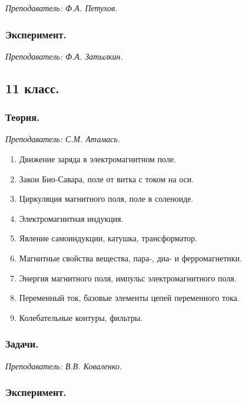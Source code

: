 \documentclass[12pt]{article}
\newlength{\h}
\newlength{\x}
\begin{document}
\textit{Преподаватель: Ф.А. Петухов.}

\subsubsection{Эксперимент.}
\label{sec:daily10exp}

\textit{Преподаватель: Ф.А. Затылкин.}\\

\subsection{11 класс.}
\label{sec:daily11}

\subsubsection{Теория.}
\label{sec:daily11th}

\textit{Преподаватель: С.М. Атамась.}\\

\begin{enumerate}
\item Движение заряда в электромагнитном поле.
\item Закон Био-Савара, поле от витка с током на оси.
\item Циркуляция магнитного поля, поле в соленоиде.
\item Электромагнитная индукция.
\item Явление самоиндукции, катушка, трансформатор.
\item Магнитные свойства вещества, пара-, диа- и ферромагнетики.
\item Энергия магнитного поля, импульс электромагнитного поля.
\item Переменный ток, базовые элементы цепей переменного тока.
\item Колебательные контуры, фильтры. 
\end{enumerate}

\subsubsection{Задачи.}
\label{sec:daily11pr}

\textit{Преподаватель: В.В. Коваленко.}\\

\subsubsection{Эксперимент.}
\label{sec:daily11exp}
\end{document}
